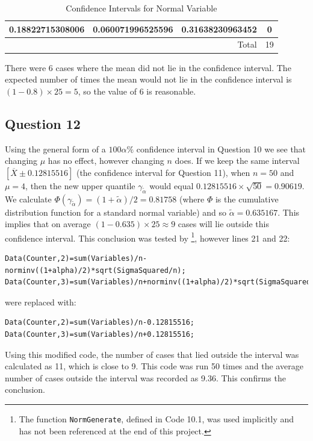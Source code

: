 \documentclass[10pt,a4paper,notitlepage]{article}
\begin{document}
\begin{table}[H]
\begin{tabular}{|c|c|c|c|}
0.18822715308006 & 0.060071996525596 & 0.31638230963452 & 0 \\ \hline
\multicolumn{3}{|r|}{Total} & 19\\ \hline
\end{tabular}
\caption{Confidence Intervals for Normal Variable}\label{tb:Q11}
\end{table}
There were 6 cases where the mean did not lie in the confidence interval. The expected number of times the mean would not lie in the confidence interval is $(1-0.8)\times 25=5$, so the value of 6 is reasonable.

\subsection*{\centering Question 12}
Using the general form of a $100\alpha\%$ confidence interval in Question 10 we see that changing $\mu$ has no effect, however changing $n$ does. If we keep the same interval $\left[\overline{X}\pm0.12815516\right]$ (the confidence interval for Question 11), when $n=50$ and $\mu=4$, then the new upper quantile $\gamma_{\widetilde{\alpha}}$ would equal $0.12815516\times\sqrt{50}=0.90619$. We calculate $\Phi\left(\gamma_{\widetilde{\alpha}}\right)=(1+\widetilde{\alpha})/2=0.81758$ (where $\Phi$ is the cumulative distribution function for a standard normal variable) and so $\widetilde{\alpha}=0.635167$. This implies that on average $(1-0.635)\times 25\approx 9$ cases will lie outside this confidence interval. This conclusion was tested by \footnote{The function \texttt{NormGenerate}, defined in Code 10.1, was used implicitly and has not been referenced at the end of this project.}, however lines 21 and 22:
\begin{verbatim}
Data(Counter,2)=sum(Variables)/n-norminv((1+alpha)/2)*sqrt(SigmaSquared/n);
Data(Counter,3)=sum(Variables)/n+norminv((1+alpha)/2)*sqrt(SigmaSquared/n);
\end{verbatim}
were replaced with:
\begin{verbatim}
Data(Counter,2)=sum(Variables)/n-0.12815516;
Data(Counter,3)=sum(Variables)/n+0.12815516;
\end{verbatim}
Using this modified code, the number of cases that lied outside the interval was calculated as 11, which is close to 9. This code was run 50 times and the average number of cases outside the interval was recorded as 9.36. This confirms the conclusion.
\end{document}
